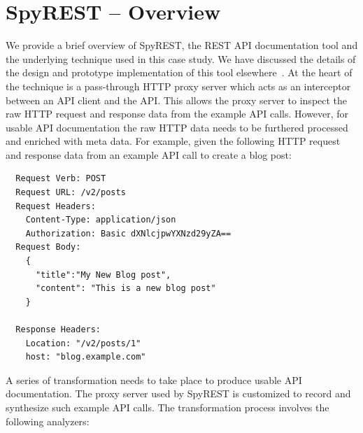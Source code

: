\documentclass[10pt, conference]{IEEEtran}
\begin{document}
\section{SpyREST -- Overview} %
\label{sec:overview}
We provide a brief overview of SpyREST, the REST API documentation tool and the underlying technique used in this case study. We have discussed the details of the design and prototype implementation of this tool elsewhere~\cite{DBLP:conf/kbse/SohanAM15, DBLP:conf/kbse/SohanAM15a}. At the heart of the technique is a pass-through HTTP proxy server which acts as an interceptor between an API client and the API. This allows the proxy server to inspect the raw HTTP request and response data from the example API calls. However, for usable API documentation the raw HTTP data needs to be furthered processed and enriched with meta data. For example, given the following HTTP request and response data from an example API call to create a blog post:
\begin{lstlisting}
  Request Verb: POST
  Request URL: /v2/posts
  Request Headers:
    Content-Type: application/json
    Authorization: Basic dXNlcjpwYXNzd29yZA==
  Request Body:
    {
      "title":"My New Blog post",
      "content": "This is a new blog post"
    }

  Response Headers:
    Location: "/v2/posts/1"
    host: "blog.example.com"

\end{lstlisting}

A series of transformation needs to take place to produce usable API documentation. The proxy server used by SpyREST is customized to record and synthesize such example API calls. The transformation process involves the following analyzers:
\end{document}
